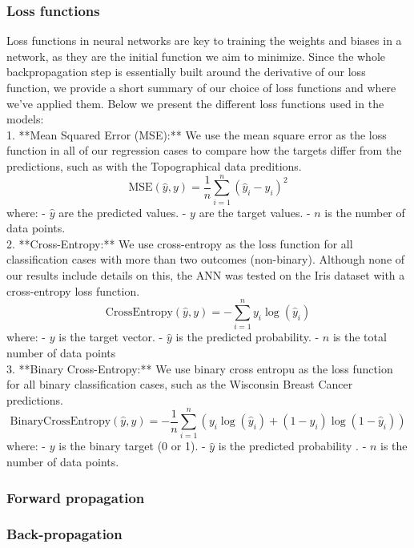 \subsubsection{Loss functions}\label{sssec:loss_functions}
Loss functions in neural networks are key to training the weights and biases in a network, as they are the initial function we aim to minimize. 
Since the whole backpropagation step is essentially built around the derivative of our loss function, we provide a short summary of our choice of 
loss functions and where we've applied them. 
%
Below we present the different loss functions used in the models: 
\\
1. **Mean Squared Error (MSE):**
We use the mean square error as the loss function in all of our regression cases to compare how the targets differ from the predictions, such
as with the Topographical data preditions. 
   \[
   \text{MSE}(\hat{y}, y) = \frac{1}{n} \sum_{i=1}^{n} (\hat{y}_i - y_i)^2
   \]
   where:
   - \( \hat{y} \) are the predicted values.
   - \( y \) are the target values.
   - \( n \) is the number of data points.
\\
2. **Cross-Entropy:**
We use cross-entropy as the loss function for all classification cases with more than two outcomes (non-binary). Although none of our results include
details on this, the ANN was tested on the Iris dataset with a cross-entropy loss function. 
   \[
   \text{CrossEntropy}(\hat{y}, y) = -\sum_{i=1}^{n} y_i \log(\hat{y}_i)
   \]
   where:
   - \( y \) is the target vector.
   - \( \hat{y} \) is the predicted probability.
   - \( n \) is the total number of data points
\\
3. **Binary Cross-Entropy:**
We use binary cross entropu as the loss function for all binary classification cases, such as the Wisconsin Breast Cancer predictions. 
   \[
   \text{BinaryCrossEntropy}(\hat{y}, y) = -\frac{1}{n} \sum_{i=1}^{n} \left( y_i \log(\hat{y}_i) + (1 - y_i) \log(1 - \hat{y}_i) \right)
   \]
   where:
   - \( y \) is the binary target (0 or 1).
   - \( \hat{y} \) is the predicted probability .
   - \( n \) is the number of data points.
\\

\subsubsection{Forward propagation}\label{sssec:forward_propagation}

\subsubsection{Back-propagation}\label{sssec:backpropagation}

